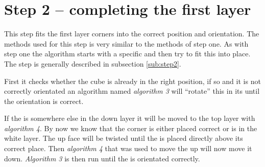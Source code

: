 \section{Step 2 -- completing the first layer}
This step fits the first layer corners into the correct position and orientation. The methods used for this step is very similar to the methods of step one. 
As with step one the algorithm starts with a specific \cpiece{} and then try to fit this into place. 
The step is generally described in subsection \ref{sub:step2}.

First it checks whether the cube is already in the right position, if so and it is not correctly orientated an algorithm named \textit{algorithm 3} will ``rotate'' this \cpiece{} in its \cubicle{} until the orientation is correct. 

If the \cpiece{} is somewhere else in the down layer it will be moved to the top layer with \textit{algorithm 4}. 
By now we know that the corner \cpiece{} is either placed correct or is in the white layer. 
The up face will be twisted until the \cpiece{} is placed directly above its correct place. 
Then \textit{algorithm 4} that was used to move the \cpiece{} up will now move it down. 
\textit{Algorithm 3} is then run until the \cpiece{} is orientated correctly.

